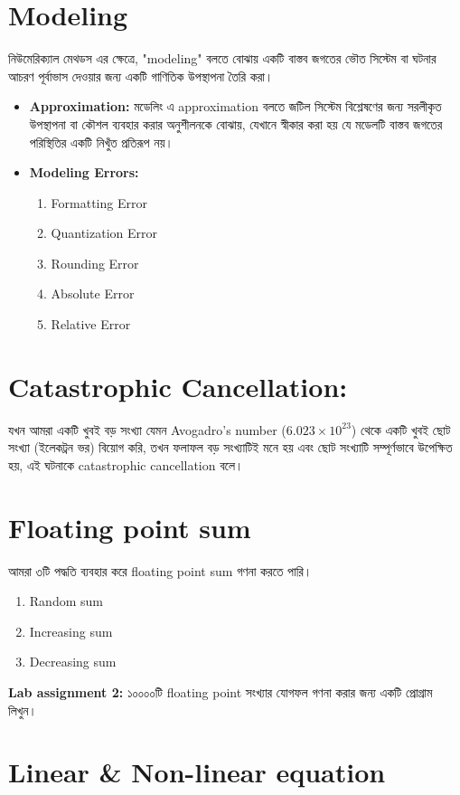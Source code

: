 \documentclass{article}
\newcommand{\textben}[1]{{\bengalifont #1}}
\begin{document}
\section{Modeling}
\textben{নিউমেরিক্যাল মেথডস এর ক্ষেত্রে,} "modeling" \textben{বলতে বোঝায় একটি বাস্তব জগতের ভৌত সিস্টেম বা ঘটনার আচরণ পূর্বাভাস দেওয়ার জন্য একটি গাণিতিক উপস্থাপনা তৈরি করা।}
\begin{itemize}
    \item \textbf{Approximation:} \textben{মডেলিং এ} approximation \textben{বলতে জটিল সিস্টেম বিশ্লেষণের জন্য সরলীকৃত উপস্থাপনা বা কৌশল ব্যবহার করার অনুশীলনকে বোঝায়, যেখানে স্বীকার করা হয় যে মডেলটি বাস্তব জগতের পরিস্থিতির একটি নিখুঁত প্রতিরূপ নয়।}
    \item \textbf{Modeling Errors:}
    \begin{enumerate}
\item Formatting Error
\item Quantization Error
\item Rounding Error
\item Absolute Error
\item Relative Error
\end{enumerate}
    
\end{itemize}
\section{Catastrophic Cancellation:}
\textben{যখন আমরা একটি খুবই বড় সংখ্যা যেমন} Avogadro's number ($6.023 \times 10^{23}$) \textben{থেকে একটি খুবই ছোট সংখ্যা (ইলেকট্রন ভর) বিয়োগ করি, তখন ফলাফল বড় সংখ্যাটিই মনে হয় এবং ছোট সংখ্যাটি সম্পূর্ণভাবে উপেক্ষিত হয়, এই ঘটনাকে} catastrophic cancellation \textben{বলে।}
\section{Floating point sum}
\textben{আমরা ৩টি পদ্ধতি ব্যবহার করে} floating point sum \textben{গণনা করতে পারি।}
\begin{enumerate}
\item Random sum
\item Increasing sum
\item Decreasing sum
\end{enumerate}
\textbf{Lab assignment 2:} \textben{১০০০০টি} floating point \textben{সংখ্যার যোগফল গণনা করার জন্য একটি প্রোগ্রাম লিখুন।}
\section{Linear \& Non-linear equation}
\end{document}
